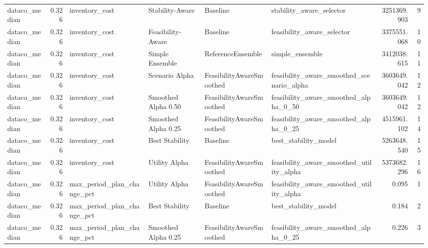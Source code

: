 \begin{table}
{\begin{tabular}{lrllllrr}
 dataco\_median &             0.326 &              inventory\_cost &       Stability-Aware &                  Baseline &                           stability\_aware\_selector &   3251369.903 &               9 \\
 dataco\_median &             0.326 &              inventory\_cost &     Feasibility-Aware &                  Baseline &                         feasibility\_aware\_selector &   3375551.068 &              10 \\
 dataco\_median &             0.326 &              inventory\_cost &       Simple Ensemble &         ReferenceEnsemble &                                    simple\_ensemble &   3412038.615 &              11 \\
 dataco\_median &             0.326 &              inventory\_cost &        Scenario Alpha &  FeasibilityAwareSmoothed &          feasibility\_aware\_smoothed\_scenario\_alpha &   3603649.042 &              12 \\
 dataco\_median &             0.326 &              inventory\_cost &   Smoothed Alpha 0.50 &  FeasibilityAwareSmoothed &              feasibility\_aware\_smoothed\_alpha\_0\_50 &   3603649.042 &              12 \\
 dataco\_median &             0.326 &              inventory\_cost &   Smoothed Alpha 0.25 &  FeasibilityAwareSmoothed &              feasibility\_aware\_smoothed\_alpha\_0\_25 &   4515961.102 &              14 \\
 dataco\_median &             0.326 &              inventory\_cost &        Best Stability &                  Baseline &                               best\_stability\_model &   5263648.540 &              15 \\
 dataco\_median &             0.326 &              inventory\_cost &         Utility Alpha &  FeasibilityAwareSmoothed &           feasibility\_aware\_smoothed\_utility\_alpha &   5373682.296 &              16 \\
 dataco\_median &             0.326 &  max\_period\_plan\_change\_pct &         Utility Alpha &  FeasibilityAwareSmoothed &           feasibility\_aware\_smoothed\_utility\_alpha &         0.095 &               1 \\
 dataco\_median &             0.326 &  max\_period\_plan\_change\_pct &        Best Stability &                  Baseline &                               best\_stability\_model &         0.184 &               2 \\
 dataco\_median &             0.326 &  max\_period\_plan\_change\_pct &   Smoothed Alpha 0.25 &  FeasibilityAwareSmoothed &              feasibility\_aware\_smoothed\_alpha\_0\_25 &         0.226 &               3 \\

\end{tabular}}
\end{table}
